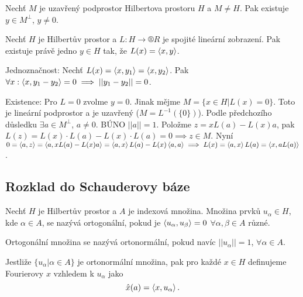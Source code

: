 \documentclass[12pt]{article}					%
\begin{document}
	\begin{dusledek}
		Nechť $M$ je uzavřený podprostor Hilbertova prostoru $H$ a $M ≠ H$. Pak existuje $y \in M^\perp$, $y ≠ 0$.
	\end{dusledek}

	\begin{veta}
		Nechť $H$ je Hilbertův prostor a $L: H \rightarrow ®R$ je spojité lineární zobrazení. Pak existuje právě jedno $y \in H$ tak, že $L(x) = \left\langle x, y\right\rangle$.

		\begin{dukazin}
			Jednoznačnost: Nechť $L(x) = \left\langle x, y_1\right\rangle = \left\langle x, y_2\right\rangle$. Pak $\forall x: \left\langle x, y_1 - y_2\right\rangle = 0 \implies ||y_1 - y_2|| = 0$.

			Existence: Pro $L = 0$ zvolme $y = 0$. Jinak mějme $M = \{x \in H | L(x) = 0\}$. Toto je lineární podprostor a je uzavřený ($M = L^{-1}(\{0\})$). Podle předchozího důsledku $\exists a \in M^\perp$, $a ≠ 0$. BÚNO $||a|| = 1$. Položme $z = xL(a) - L(x)a$, pak $L(z) = L(x)·L(a) - L(x)·L(a) = 0 \implies z \in M$. Nyní $0 = \left\langle a, z\right\rangle = \left\langle a, xL(a) - L(x)a\right\rangle = \left\langle a, x\right\rangle L(a) - L(x)\left\langle a, a\right\rangle \implies L(x) = \left\langle a, x\right\rangle L(a) = \left\langle x, aL(a)\right\rangle$.
		\end{dukazin}
	\end{veta}


	\subsection{Rozklad do Schauderovy báze}
	\begin{definice}
		Nechť $H$ je Hilbertův prostor a $A$ je indexová množina. Množina prvků $u_\alpha \in H$, kde $\alpha \in A$, se nazývá ortogonální, pokud je $\left\langle u_\alpha, u_\beta\right\rangle = 0$ $\forall \alpha, \beta \in A$ různé.

		Ortogonální množina se nazývá ortonormální, pokud navíc $||u_\alpha|| = 1$, $\forall \alpha \in A$.

		Jestliže $\{u_\alpha | \alpha \in A\}$ je ortonormální množina, pak pro každé $x \in H$ definujeme Fourierovy $x$ vzhledem k $u_\alpha$ jako
		$$ \hat{x}(a) = \left\langle x, u_\alpha\right\rangle. $$
	\end{definice}
\end{document}
